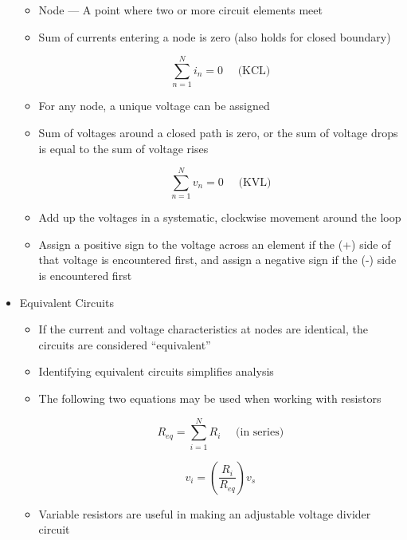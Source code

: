 \begin{itemize}
\begin{itemize}
      \item Node — A point where two or more circuit elements meet

      \item Sum of currents entering a node is zero (also holds for closed boundary)

        $$\boxed{\sum_{n=1}^N i_n=0\,\,\,\,\,\,\,\,\text{(KCL)}}$$

      \item For any node, a unique voltage can be assigned

      \item Sum of voltages around a closed path is zero, or the sum of voltage drops is equal to the sum of voltage rises

        $$\boxed{\sum_{n=1}^N v_n=0\,\,\,\,\,\,\,\,\text{(KVL)}}$$

      \item Add up the voltages in a systematic, clockwise movement around the loop

      \item Assign a positive sign to the voltage across an element if the (+) side of that voltage is encountered first, and assign a negative sign if the (-) side is encountered first

    \end{itemize}

  \item Equivalent Circuits

    \begin{itemize}

      \item If the current and voltage characteristics at nodes are identical, the circuits are considered ``equivalent''

      \item Identifying equivalent circuits simplifies analysis

      \item The following two equations may be used when working with resistors

        $$\boxed{R_{eq}=\sum_{i=1}^N R_i\,\,\,\,\,\,\,\,\text{(in series)}}$$

        $$\boxed{v_i=\left( \frac{R_i}{R_{eq}} \right)v_s}$$

      \item Variable resistors are useful in making an adjustable voltage divider circuit

    \end{itemize}

\end{itemize}




